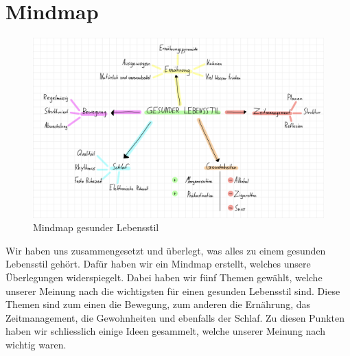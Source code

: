\chapter{Mindmap}
\authortoc{\bastian}{\chapterident}
\begin{figure}[!ht]
  \centering
  \includegraphics[width=.9\linewidth]{./images/mindmap.png}
  \caption[Ein von uns digital erstelltes Mindmap]{Mindmap gesunder Lebensstil}
  \label{fig:mindmap}
\end{figure}
Wir haben uns zusammengesetzt und überlegt, was alles zu einem gesunden Lebensstil gehört. Dafür haben wir ein Mindmap erstellt, welches unsere Überlegungen widerspiegelt. Dabei haben wir fünf Themen gewählt, welche unserer Meinung nach die wichtigsten für einen gesunden Lebensstil sind. Diese Themen sind zum einen die Bewegung, zum anderen die Ernährung, das Zeitmanagement, die Gewohnheiten und ebenfalls der Schlaf. Zu diesen Punkten haben wir schliesslich einige Ideen gesammelt, welche unserer Meinung nach wichtig waren.
